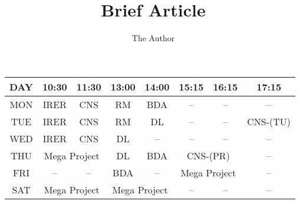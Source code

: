 \documentclass[11pt]{article}
\title{Brief Article}
\author{The Author}
\begin{document}
\begin{table}[h]
\centering
\begin{tabular}{|c||c|c|c|c|c|c|c|}
\hline
DAY&10:30&11:30&13:00&14:00&15:15&16:15&17:15\\
\hline
MON & \cellcolor{LightCoral}IRER & \cellcolor{LightSkyBlue}CNS & \cellcolor{PaleGreen}RM & \cellcolor{LemonChiffon}BDA & -- & -- & --\\
\hline
TUE & \cellcolor{LightCoral}IRER & \cellcolor{LightSkyBlue}CNS & \cellcolor{PaleGreen}RM & \cellcolor{Thistle}DL & -- & -- & \cellcolor{PowderBlue}CNS-(TU)\\
\hline
WED & \cellcolor{LightCoral}IRER & \cellcolor{LightSkyBlue}CNS & \cellcolor{Thistle}DL & -- & -- & -- & -- \\
\hline
THU & \multicolumn{2}{c|}{\cellcolor{PeachPuff}Mega Project} & \cellcolor{Thistle}DL & \cellcolor{LemonChiffon}BDA & \multicolumn{2}{c|}{\cellcolor{LavenderBlush}CNS-(PR)} & --\\
\hline
FRI & -- & -- & \cellcolor{LemonChiffon}BDA & -- & \multicolumn{2}{c|}{\cellcolor{PeachPuff}Mega Project} & --\\
\hline
SAT & \multicolumn{2}{c|}{\cellcolor{PeachPuff}Mega Project} & \multicolumn{2}{c|}{\cellcolor{PeachPuff}Mega Project} & -- & -- & --\\
\hline
\end{tabular}
\end{table}
\end{document}
